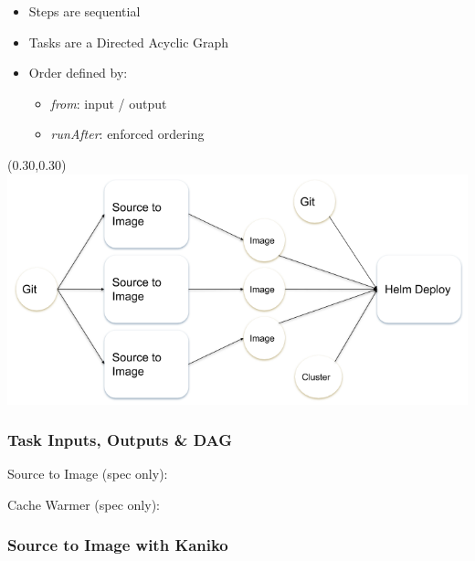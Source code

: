\documentclass[aspectratio=169,11pt,hyperref={colorlinks=true}]{beamer}
\begin{document}
\begin{lblackrwhiteframe}
\begin{lblackrwhiteframe}
\begin{blackframe}
\begin{2columnsframe}
  {
    \begin{itemize}
      \item Steps are sequential
      \item Tasks are a Directed Acyclic Graph
      \item Order defined by:
      \begin{itemize}
        \item {\em from}: input / output
        \item {\em runAfter}: enforced ordering
      \end{itemize}
    \end{itemize}
  }
  {
  \begin{textblock*}{0.65\paperwidth}(0.30\paperwidth,0.30\paperheight)
    \centering
    \includegraphics[width=0.65\paperwidth]{img/pipeline.png}
  \end{textblock*}
  }
  \frametitle{Task Inputs, Outputs \& DAG}
\end{2columnsframe}

\begin{2columnsframe}
  {
  {\tiny Source to Image (spec only): \\}
  
  }
  {
  
  {\tiny Cache Warmer (spec only): \\}
  
  }
  \frametitle{Source to Image with Kaniko}
\end{2columnsframe}


\end{blackframe}
\end{lblackrwhiteframe}
\end{lblackrwhiteframe}
\end{document}
